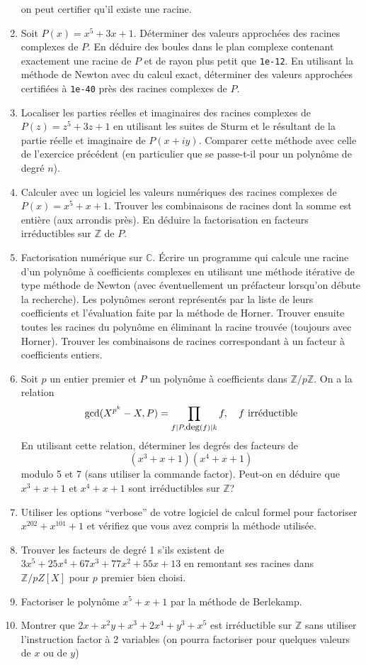 \documentclass[a4paper,11pt]{book}
\begin{document}
\begin{giacjshere}
\begin{enumerate}
on peut certifier qu'il existe une racine.
\item Soit $P(x)=x^5+3x+1$. D\'eterminer des valeurs approch\'ees
des racines complexes de $P$. En d\'eduire des boules dans le
plan complexe contenant exactement une racine de $P$ et
de rayon plus petit que \verb|1e-12|. En utilisant la m\'ethode
de Newton avec du calcul exact, d\'eterminer des valeurs approch\'ees
certifi\'ees \`a \verb|1e-40| pr\`es des racines complexes de $P$.
\item Localiser les parties r\'eelles et imaginaires des racines
  complexes de $P(z)=z^5+3z+1$ en utilisant les suites de Sturm
et le r\'esultant de la partie r\'eelle et imaginaire de
$P(x+iy)$. Comparer cette m\'ethode avec celle de l'exercice
pr\'ec\'edent (en particulier que se passe-t-il pour un polyn\^ome
de degr\'e $n$).
\item Calculer avec un logiciel les valeurs numériques des racines
complexes de $P(x)=x^5+x+1$. Trouver les combinaisons de racines
dont la somme est entière (aux arrondis près). En déduire la factorisation
en facteurs irréductibles sur $\mathbb{Z}$ de $P$.
\item Factorisation numérique sur $\mathbb{C}$. \'Ecrire un programme
qui calcule une racine d'un polynôme à coefficients complexes
en utilisant une méthode itérative de type méthode de Newton 
(avec éventuellement un préfacteur lorsqu'on débute la recherche).
Les polynômes seront représentés par la liste de leurs coefficients
et l'évaluation faite par la méthode de Horner.
Trouver ensuite toutes les racines du polynôme en éliminant la
racine trouvée (toujours avec Horner). Trouver les combinaisons
de racines correspondant à un facteur à coefficients entiers.
\item Soit $p$ un entier premier et $P$ un polynôme \`a
coefficients dans $\mathbb{Z}/p\mathbb{Z}$. On a la relation
\[ \mbox{gcd}(X^{p^k}-X,P) = \prod_{ f | P, \mbox{\small deg}(f) | k} f, 
\quad f \mbox{ irréductible} \]
En utilisant cette relation, 
déterminer les degrés des facteurs de 
\[ (x^3+x+1)(x^4+x+1) \]
modulo 5 et 7 (sans utiliser la commande factor). 
Peut-on en déduire que $x^3+x+1$ et
$x^4+x+1$ sont irréductibles sur $\mathbb{Z}$?
\item Utiliser les options ``verbose'' de votre logiciel de calcul formel
pour factoriser $x^{202}+x^{101}+1$ et vérifiez que vous avez compris
la méthode utilisée.
\item Trouver les facteurs de degré 1 s'ils existent de
$3x^5+25x^4+67x^3+77x^2+55x+13$ en remontant ses racines
dans $\mathbb{Z}/pZ[X]$ pour $p$ premier bien choisi.
\item Factoriser le polynôme $x^5+x+1$ par la méthode 
de Berlekamp.
\item Montrer que $2x+x^2y+x^3+2x^4+y^3+x^5$ est irréductible sur $\mathbb{Z}$
sans utiliser l'instruction factor à 2 variables (on pourra factoriser 
pour quelques valeurs de $x$ ou de $y$)


\end{enumerate}
\end{giacjshere}
\end{document}
